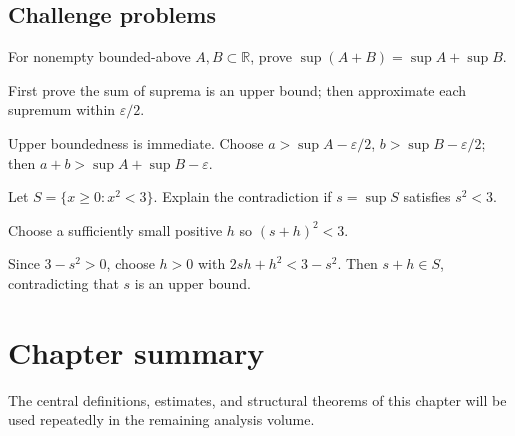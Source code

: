 \subsection*{Challenge problems}

\begin{exercise}\label{exr:ii01-expand-15}
For nonempty bounded-above \(A,B\subset\mathbb R\), prove \(\sup(A+B)=\sup A+\sup B\).
\end{exercise}
\begin{hint}
First prove the sum of suprema is an upper bound; then approximate each supremum within \(\varepsilon/2\).
\end{hint}
\begin{solution}
Upper boundedness is immediate. Choose \(a>\sup A-\varepsilon/2\), \(b>\sup B-\varepsilon/2\); then \(a+b>\sup A+\sup B-\varepsilon\).
\end{solution}

\begin{exercise}\label{exr:ii01-expand-16}
Let \(S=\{x\ge0:x^2<3\}\). Explain the contradiction if \(s=\sup S\) satisfies \(s^2<3\).
\end{exercise}
\begin{hint}
Choose a sufficiently small positive \(h\) so \((s+h)^2<3\).
\end{hint}
\begin{solution}
Since \(3-s^2>0\), choose \(h>0\) with \(2sh+h^2<3-s^2\). Then \(s+h\in S\), contradicting that \(s\) is an upper bound.
\end{solution}
\section*{Chapter summary}
The central definitions, estimates, and structural theorems of this chapter will be used repeatedly in the remaining analysis volume.
